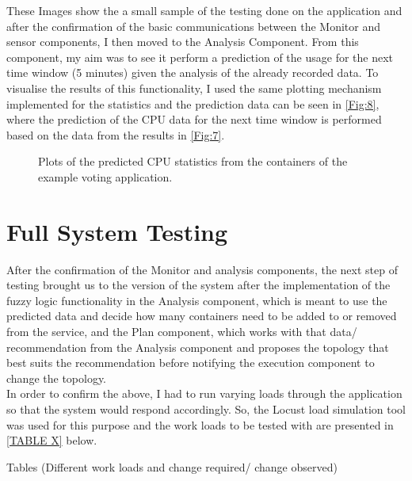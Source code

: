 These Images show the a small sample of the testing done on the application and after the confirmation of the basic communications between the Monitor and sensor components, I then moved to the Analysis Component. From this component, my aim was to see it perform a prediction of the usage for the next time window (5 minutes) given the analysis of the already recorded data. To visualise the results of this functionality, I used the same plotting mechanism implemented for the statistics and the prediction data can be seen in \autoref{Fig:8}, where the prediction of the CPU data for the next time window is performed based on the data from the results in \autoref{Fig:7}.
\begin{figure}[H]
\centering
  \hfill
  \hfill   
    \hfill
  \hfill
    \caption{Plots of the predicted CPU statistics from the containers of the example voting application.} 
   \label{Fig:8} 
\end{figure}

\section{Full System Testing }
After the confirmation of the Monitor and analysis components, the next step of testing brought us to the version of the system after the implementation of the fuzzy logic functionality in the Analysis component, which is meant to use the predicted data and decide how many containers need to be added to or removed from the service, and the Plan component, which works with that data/ recommendation from the Analysis component and proposes the topology that best suits the recommendation before notifying the execution component to change the topology.\\
In order to confirm the above, I had to run varying loads through the application so that the system would respond accordingly. So, the Locust load simulation tool was used for this purpose and the work loads to be tested with are presented in \autoref{TABLE X} below.

Tables (Different work loads and change required/ change observed)

